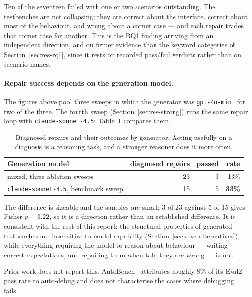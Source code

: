 \documentclass[11pt,a4paper,titlepage=false]{scrreprt}
\begin{document}
Ten of the seventeen failed with one or two scenarios outstanding. The testbenches are not
collapsing; they are correct about the interface, correct about most of the behaviour, and
wrong about a corner case --- and each repair trades that corner case for another. This is
the RQ1 finding arriving from an independent direction, and on firmer evidence than the
keyword categories of Section~\ref{sec:res-rq1}, since it rests on recorded pass/fail
verdicts rather than on scenario names.

\paragraph{Repair success depends on the generation model.} The figures above pool three
sweeps in which the generator was \texttt{gpt-4o-mini} for two of the three. The fourth sweep
(Section~\ref{sec:res-strong}) runs the same repair loop with \texttt{claude-sonnet-4.5};
Table~\ref{tab:repair-by-model} compares them.

\begin{table}[H]
\centering
\small
\begin{tabular}{@{}l r r r@{}}
\toprule
\textbf{Generation model} & \textbf{diagnosed repairs} & \textbf{passed} & \textbf{rate} \\
\midrule
mixed, three ablation sweeps & 23 & 3 & 13\% \\
\texttt{claude-sonnet-4.5}, benchmark sweep & 15 & 5 & \textbf{33\%} \\
\bottomrule
\end{tabular}
\caption{Diagnosed repairs and their outcomes by generator. Acting usefully on a diagnosis is
a reasoning task, and a stronger reasoner does it more often.}
\label{tab:repair-by-model}
\end{table}

The difference is sizeable and the samples are small; 3 of 23 against 5 of 15 gives Fisher
$p=0.22$, so it is a direction rather than an established difference. It is consistent with the
rest of this report: the structural properties of generated testbenches are insensitive to model
capability (Section~\ref{sec:disc-alternatives}), while everything requiring the model to
reason about behaviour --- writing correct expectations, and repairing them when told they
are wrong --- is not.

Prior work does not report this. AutoBench~\cite{qiu2024autobench} attributes roughly 8\% of
its Eval2 pass rate to auto-debug and does not characterise the cases where debugging fails.
\end{document}
